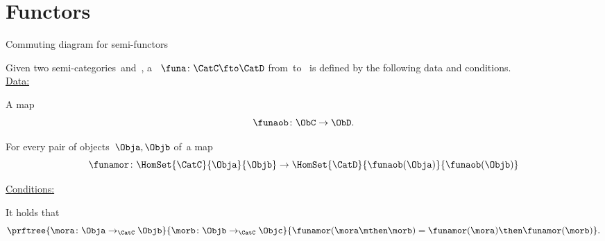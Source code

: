 
\clearpage
\section{Functors}

\begin{marginfigure}
  \begin{center}
  \end{center}
  \caption{Commuting diagram for semi-functors}
  \label{fig:functor_detail}
\end{marginfigure}

\begin{ctdefinition}
  \label{def:semi-functor}
  Given two semi-categories~\CatC and~\CatD, a \emph{}~$\funa\colon \CatC\fto \CatD$ from~\CatC to ~\CatD is defined by the following data and conditions. \\
  \underline{Data:}
  \begin{compactenum}
    [i)]
    \item A map
    \begin{equation}
      \funaob\colon \ObC \to \ObD.
     \end{equation}
    \item For every pair of objects~$\Obja, \Objb$ of~\CatC a map
    \begin{equation}
      \funamor\colon \HomSet{\CatC}{\Obja}{\Objb} \to \HomSet{\CatD}{\funaob(\Obja)}{\funaob(\Objb)}
    \end{equation}
  \end{compactenum}
  \underline{Conditions:}
  \begin{compactenum}
    \item It holds that
    \begin{equation}
      \prftree{\mora\colon \Obja \to_{\CatC} \Objb}{\morb\colon \Objb \to_{\CatC} \Objc}{
      \funamor(\mora \mthen \morb)=\funamor(\mora)\then \funamor(\morb)
      }.
    \end{equation}
  \end{compactenum}
\end{ctdefinition}

